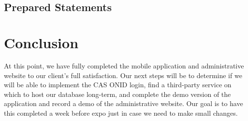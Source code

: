 \documentclass[onecolumn, draftclsnofoot,10pt, compsoc]{IEEEtran}
\begin{document}
  \subsection{Prepared Statements}

\section{Conclusion}
At this point, we have fully completed the mobile application and administrative website to our client's full satisfaction. Our next steps will be to determine if we will be able to implement the CAS ONID login, find a
third-party service on which to host our database long-term, and complete the demo version of the application and record a demo of the administrative website. Our goal is to have this completed a week before expo just in
case we need to make small changes.
\end{document}
